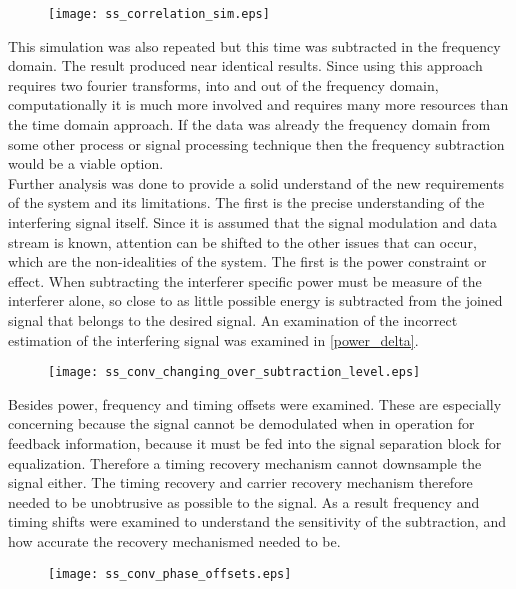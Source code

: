 \begin{figure}
\texttt{[image: ss\_correlation\_sim.eps]}
\end{figure} 

This simulation was also repeated but this time was subtracted in the frequency domain.  The result produced near identical results.  Since using this approach requires two fourier transforms, into and out of the frequency domain, computationally it is much more involved and requires many more resources than the time domain approach.  If the data was already the frequency domain from some other process or signal processing technique then the frequency subtraction would be a viable option.\\

Further analysis was done to provide a solid understand of the new requirements of the system and its limitations.  The first is the precise understanding of the interfering signal itself.  Since it is assumed that the signal modulation and data stream is known, attention can be shifted to the other issues that can occur, which are the non-idealities of the system.  The first is the power constraint or effect.  When subtracting the interferer specific power must be measure of the interferer alone, so close to as little possible energy is subtracted from the joined signal that belongs to the desired signal.  An examination of the incorrect estimation of the interfering signal was examined in \ref{power_delta}.

\begin{figure}
\texttt{[image: ss\_conv\_changing\_over\_subtraction\_level.eps]}
\end{figure}

Besides power, frequency and timing offsets were examined.  These are especially concerning because the signal cannot be demodulated when in operation for feedback information, because it must be fed into the signal separation block for equalization.  Therefore a timing recovery mechanism cannot downsample the signal either.  The timing recovery and carrier recovery mechanism therefore needed to be unobtrusive as possible to the signal.  As a result frequency and timing shifts were examined to understand the sensitivity of the subtraction, and how accurate the recovery mechanismed needed to be.

\begin{figure}
\texttt{[image: ss\_conv\_phase\_offsets.eps]}
\end{figure}

